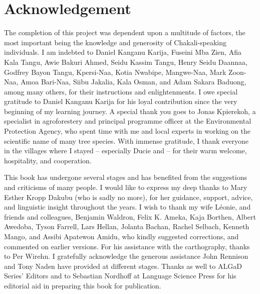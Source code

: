 \chapter*{Acknowledgement}
\label{sec:acknow}


The completion of this project was dependent upon a multitude of factors, the most important being  the  knowledge and generosity of Chakali-speaking individuals. I am  indebted to  Daniel Kanganu Karija,   Fuseini Mba Zien, Afia Kala Tangu,  Awie Bakuri Ahmed,  Seidu Kassim Tangu, Henry Seidu Daannaa, Godfrey Bayon Tangu, Kpersi-Naa\dag, Kotia Nwabipe\dag, Mangwe-Naa\dag, Mark Zoon-Naa\dag, Amoa Bari-Naa, Siibu Jakalia, Kala Osman,  and Adam Sakara Baduong, among many others,  for their instructions and enlightenments. I owe special gratitude to Daniel Kanganu Karija for his loyal contribution since the very beginning of my learning journey. A special thank you goes  to Jonas Kpierekoh, a specialist in agroforestery and principal programme officer at the  Environmental Protection Agency, who spent time with me and local experts in  working on the scientific name of many tree species.  With immense gratitude, I  thank everyone in the villages where I stayed -- especially Ducie and  --  for their warm welcome, hospitality, and cooperation. 

This book has undergone several stages and has benefited from the suggestions  and criticisms of many people.  I would like to express my deep thanks to  Mary Esther Kropp Dakubu (who is sadly no more),  for her guidance, support,  advice,  and  linguistic insight throughout the years.  I wish to thank my wife Léonie, and friends and colleagues, Benjamin Waldron,  Felix K. Ameka,  Kaja Borthen, Albert Awedoba,  Tyson Farrell, Lars Hellan, Jolanta Bachan, Rachel Selbach, Kenneth Mango, and Assibi Apatewon Amidu, who kindly suggested corrections, and commented on  earlier versions.  For his assistance with the carthography, thanks to Per Wirehn. I  gratefully  acknowledge  the  generous assistance John Rennison and   Tony Naden have provided at different stages.  Thanks as well to ALGaD Series' Editors and to  Sebastian Nordhoff at Language Science Press for his editorial aid in preparing this book for publication.